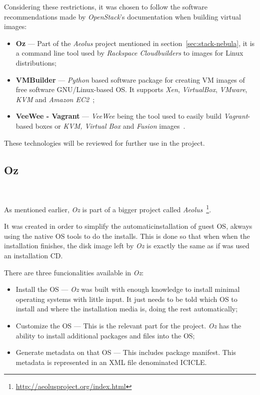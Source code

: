 Considering these restrictions, it was chosen to follow the software recommendations made by \textit{OpenStack}'s documentation when building virtual images:

\begin{itemize}
\item \textbf{Oz} --- Part of the \textit{Aeolus} project mentioned in section~\ref{sec:stack-nebula}, it is a command line tool used by \textit{Rackspace Cloudbuilders} to images for Linux distributions;
\item \textbf{VMBuilder} --- \textit{Python} based software package for creating VM images of free software GNU/Linux-based OS. It supports \textit{Xen}, \textit{VirtualBox}, \textit{VMware}, \textit{KVM} and \textit{Amazon EC2}~\cite{vmbuilder};
\item \textbf{VeeWee - Vagrant} --- \textit{VeeWee} being the tool used to easily build \textit{Vagrant}-based boxes or \textit{KVM, Virtual Box} and \textit{Fusion} images~\cite{essex-doc-vms,veewee}.
\end{itemize}

These technologies will be reviewed for further use in the project.

\subsection{Oz}~\label{subsec:oz}

As mentioned earlier, \textit{Oz} is part of a bigger project called \textit{Aeolus}~\footnote{\url{http://aeolusproject.org/index.html}}.

It was created in order to simplify the automaticinstallation of guest OS, akways using the native OS tools to do the installs. This is done so that when when the installation finishes, the disk image left by \textit{Oz} is exactly the same as if was used an installation CD. 

There are three funcionalities available in \textit{Oz}:

\begin{itemize}
\item Install the OS --- \textit{Oz} was built with enough knowledge to install minimal operating systems with little input. It just needs to be told which OS to install and where the installation media is, doing the rest automatically;
\item Customize the OS --- This is the relevant part for the project. \textit{Oz} has the ability to install additional packages and files into the OS;
\item Generate metadata on that OS --- This includes package manifest. This metadata is represented in an XML file denominated ICICLE.
\end{itemize}


